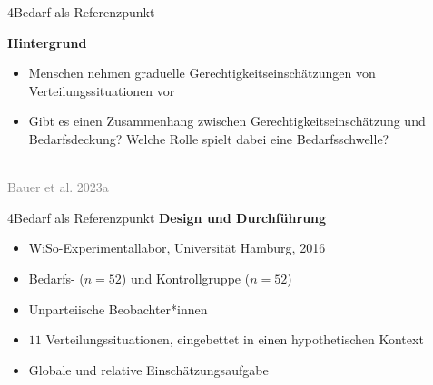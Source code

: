 \documentclass[xcolor=table,9pt,aspectratio=169]{beamer}
\begin{document}
\begin{frame}{\vspace*{10mm}4\hspace*{1em}Bedarf als Referenzpunkt}
\begin{multicols}{2}
   \textbf{Hintergrund}\\
   \medskip
   \begin{itemize}
      \item Menschen nehmen graduelle Gerechtigkeitseinschätzungen von Verteilungssituationen vor
      \item Gibt es einen Zusammenhang zwischen Gerechtigkeitseinschätzung und Bedarfsdeckung? Welche Rolle spielt dabei eine Bedarfsschwelle?
   \end{itemize}
   \vfill
   \begin{center}
      \\
      \footnotesize{\textcolor{gray}{Bauer et al. 2023a}}
   \end{center}
\end{multicols}
\end{frame}


\begin{frame}{\vspace*{10mm}4\hspace*{1em}Bedarf als Referenzpunkt}
\textbf{Design und Durchführung}\\
\medskip
\begin{itemize}
   \item WiSo-Experimentallabor, Universität Hamburg, 2016
   \item Bedarfs- ($n=52$) und Kontrollgruppe ($n=52$)
   \item Unparteiische Beobachter*innen
   \item $11$ Verteilungssituationen, eingebettet in einen hypothetischen Kontext
   \item Globale und relative Einschätzungsaufgabe
\end{itemize}
\end{frame}
\end{document}
